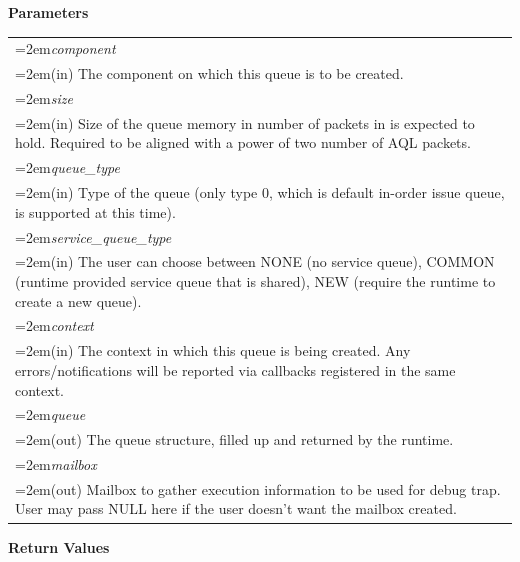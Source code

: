 \documentclass{book}
\newcommand{\hsaarg}[1]{\textit{#1}}
\begin{document}
\noindent\textbf{Parameters}\\[-5mm]
\noindent\begin{longtable}{@{}>{\hangindent=2em}p{\textwidth}}
\hsaarg{component}\\\hspace{2em}(in) The component on which this queue is to be created.\\[2mm]
\hsaarg{size}\\\hspace{2em}(in) Size of the queue memory in number of packets in is expected to hold. Required to be aligned with a power of two number of AQL packets.\\[2mm]
\hsaarg{queue\_type}\\\hspace{2em}(in) Type of the queue (only type 0, which is default in-order issue queue, is supported at this time).\\[2mm]
\hsaarg{service\_queue\_type}\\\hspace{2em}(in) The user can choose between NONE (no service queue), COMMON (runtime provided service queue that is shared), NEW (require the runtime to create a new queue).\\[2mm]
\hsaarg{context}\\\hspace{2em}(in) The context in which this queue is being created. Any errors/notifications will be reported via callbacks registered in the same context.\\[2mm]
\hsaarg{queue}\\\hspace{2em}(out) The queue structure, filled up and returned by the runtime.\\[2mm]
\hsaarg{mailbox}\\\hspace{2em}(out) Mailbox to gather execution information to be used for debug trap. User may pass NULL here if the user doesn't want the mailbox created.
\end{longtable}
\vspace{-5mm}\noindent\textbf{Return Values}\\[-5mm]
\end{document}
